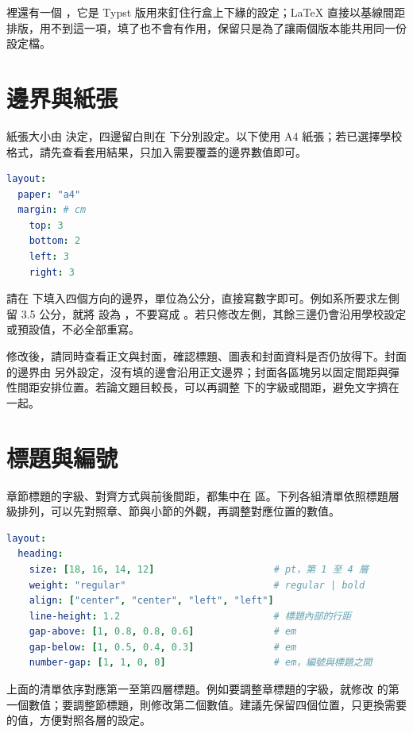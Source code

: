  裡還有一個 ，它是 Typst 版用來釘住行盒上下緣的設定；\LaTeX{} 直接以基線間距排版，用不到這一項，填了也不會有作用，保留只是為了讓兩個版本能共用同一份設定檔。

\section{邊界與紙張}

紙張大小由  決定，四邊留白則在  下分別設定。以下使用 A4 紙張；若已選擇學校格式，請先查看套用結果，只加入需要覆蓋的邊界數值即可。

\begin{lstlisting}[language=yaml]
layout:
  paper: "a4"
  margin: # cm
    top: 3
    bottom: 2
    left: 3
    right: 3
\end{lstlisting}

請在  下填入四個方向的邊界，單位為公分，直接寫數字即可。例如系所要求左側留 3.5 公分，就將  設為 ，不要寫成 \code{3.5cm}。若只修改左側，其餘三邊仍會沿用學校設定或預設值，不必全部重寫。

修改後，請同時查看正文與封面，確認標題、圖表和封面資料是否仍放得下。封面的邊界由  另外設定，沒有填的邊會沿用正文邊界；封面各區塊另以固定間距與彈性間距安排位置。若論文題目較長，可以再調整  下的字級或間距，避免文字擠在一起。

\section{標題與編號}

章節標題的字級、對齊方式與前後間距，都集中在  區。下列各組清單依照標題層級排列，可以先對照章、節與小節的外觀，再調整對應位置的數值。

\begin{lstlisting}[language=yaml]
layout:
  heading:
    size: [18, 16, 14, 12]                     # pt，第 1 至 4 層
    weight: "regular"                          # regular | bold
    align: ["center", "center", "left", "left"]
    line-height: 1.2                           # 標題內部的行距
    gap-above: [1, 0.8, 0.8, 0.6]              # em
    gap-below: [1, 0.5, 0.4, 0.3]              # em
    number-gap: [1, 1, 0, 0]                   # em，編號與標題之間
\end{lstlisting}

上面的清單依序對應第一至第四層標題。例如要調整章標題的字級，就修改  的第一個數值；要調整節標題，則修改第二個數值。建議先保留四個位置，只更換需要的值，方便對照各層的設定。

